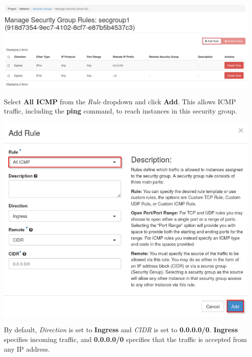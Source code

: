 \documentclass[letterpaper, 12pt]{article}
\begin{document}
\begin{enumerate}
\begin{labstep}
        \begin{center}
            \includegraphics[width=\linewidth]{images/part5/step4.png}
        \end{center}
    \end{labstep}

    \begin{labstep}
        Select \textbf{All ICMP} from the \textit{Rule} dropdown and click \textbf{Add}.
        This allows ICMP traffic, including the \textbf{ping} command, to reach instances in this security group.

        \begin{center}
            \includegraphics[width=\linewidth]{images/part5/step5.png}
        \end{center}
    \end{labstep}

    \begin{notebox}
        By default, \textit{Direction} is set to \textbf{Ingress} and \textit{CIDR} is set to \textbf{0.0.0.0/0}.
        \textbf{Ingress} specifies incoming traffic, and \textbf{0.0.0.0/0} specifies that the traffic is accepted from any IP address.
    \end{notebox}


\end{enumerate}
\end{document}
